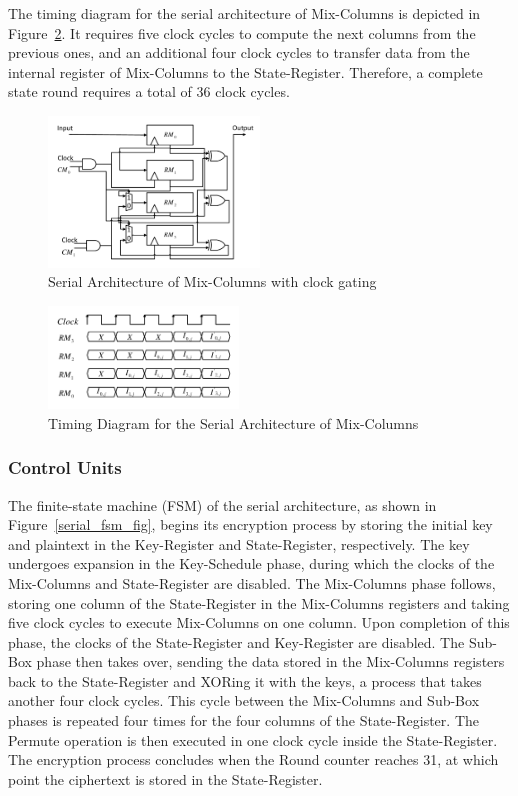 \documentclass[final,5p,times,twocolumn]{elsarticle}
\begin{document}
The timing diagram for the serial architecture of Mix-Columns is depicted in Figure~\ref{serial_time_diagrm_mix_colunms}.
It requires five clock cycles to compute the next columns from the previous ones, and an additional four clock cycles to transfer data from the internal register of Mix-Columns to the State-Register.
Therefore, a complete state round requires a total of 36 clock cycles.


\begin{figure}[h]%
    \centering
    \includegraphics[width=0.5\textwidth]{Mix-Columns.pdf}
    \caption{Serial Architecture of Mix-Columns with clock gating}\label{serial_mix_columns_fig}
\end{figure}

\begin{figure}[h]%
    \centering
    \includegraphics[width=0.45\textwidth]{Mix-Columns-Times.pdf}
    \caption{Timing Diagram for the Serial Architecture of Mix-Columns }\label{serial_time_diagrm_mix_colunms}
\end{figure}

\subsubsection{Control Units}\label{subsubsec3}

The finite-state machine (FSM) of the serial architecture, as shown in Figure~\ref{serial_fsm_fig}, begins its encryption process by storing the initial key and plaintext in the Key-Register and State-Register, respectively.
The key undergoes expansion in the Key-Schedule phase, during which the clocks of the Mix-Columns and State-Register are disabled.
The Mix-Columns phase follows, storing one column of the State-Register in the Mix-Columns registers and taking five clock cycles to execute Mix-Columns on one column.
Upon completion of this phase, the clocks of the State-Register and Key-Register are disabled.
The Sub-Box phase then takes over, sending the data stored in the Mix-Columns registers back to the State-Register and XORing it with the keys, a process that takes another four clock cycles.
This cycle between the Mix-Columns and Sub-Box phases is repeated four times for the four columns of the State-Register.
The Permute operation is then executed in one clock cycle inside the State-Register.
The encryption process concludes when the Round counter reaches 31, at which point the ciphertext is stored in the State-Register.
\end{document}
